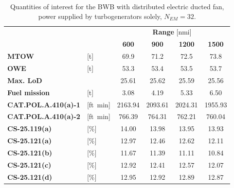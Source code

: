 \begin{table}[!h]
	\centering
	\begin{tabular}{l l c c c c}
		\cline{3-6}
		& & \multicolumn{4}{c}{\textbf{Range} [nmi]} \\
		& & \textbf{600} & \textbf{900} & \textbf{1200} & \textbf{1500} \\
		\hline
		\textbf{MTOW} & [\si{\tonne}] & 69.9 & 71.2 & 72.5 & 73.8 \\
		\textbf{OWE} & [\si{\tonne}] & 53.3 & 53.4 & 53.5 & 53.7 \\
		\textbf{Max. LoD} & & 25.61 & 25.62 & 25.59 & 25.56  \\
		\textbf{Fuel mission} & [\si{\tonne}] & 3.08 & 4.19 & 5.33 & 6.50 \\
		\hline
		\textbf{CAT.POL.A.410(a)-1} & [ft\si{\per\minute}] & 2163.94 & 2093.61 & 2024.31 & 1955.93 \\
		\textbf{CAT.POL.A.410(a)-2} & [ft\si{\per\minute}] & 766.39 & 764.31 & 762.21 & 760.04 \\
		\textbf{CS-25.119(a)} & [\%] & 14.00 & 13.98 & 13.95 & 13.93 \\
		\textbf{CS-25.121(a)} & [\%] & 12.97 & 12.46 & 12.62 & 12.11 \\
		\textbf{CS-25.121(b)} & [\%] & 11.67 & 11.39 & 11.11 & 10.84 \\
		\textbf{CS-25.121(c)} & [\%] & 12.92 & 12.41 & 12.57 & 12.07 \\
		\textbf{CS-25.121(d)} & [\%] & 12.95 & 12.92 & 12.89 & 12.87 \\
		\hline
	\end{tabular}
	\caption{Quantities of interest for the BWB with distributed electric ducted fan, power supplied by turbogenerators solely, $N_{EM}=32$.}
	\label{tab:bwb_hybrid_dep_gen_optim_res_n32}
\end{table}
